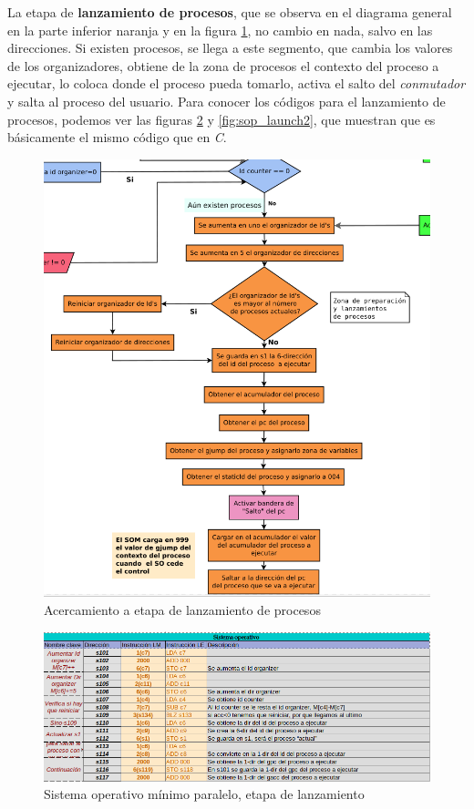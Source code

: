 \documentclass[letterpaper,12pt,oneside]{book}
\begin{document}
			
			La etapa de \textbf{lanzamiento de procesos}, que se observa en el diagrama general en la parte inferior naranja
			y en la figura \ref{fig:diag_somp_launch_process}, no cambio en nada, 
			salvo en las direcciones. Si existen procesos,
			se llega a este segmento, que cambia los valores de los organizadores, obtiene de la zona de procesos el contexto del proceso
			a ejecutar,
			lo coloca donde el proceso pueda tomarlo, activa el salto del \textit{conmutador} y salta al proceso del usuario. Para 
			conocer los códigos para el lanzamiento de procesos, podemos ver las figuras \ref{fig:sop_launch} y \ref{fig:sop_launch2},
			que muestran que es básicamente el mismo código que en \textit{C}.
			
		
			\begin{figure}[H]		
				\centering
				\includegraphics[scale=0.45]{media/Paralela/diag_somp_launch_process.png}
				\caption{Acercamiento a etapa de lanzamiento de procesos}
				\label{fig:diag_somp_launch_process}
			\end{figure}	
			
			
			\begin{figure}[H]		
				\centering
				\includegraphics[scale=0.53]{media/Paralela/sop_launch1.png}
				\caption{Sistema operativo mínimo paralelo, etapa de lanzamiento}
				\label{fig:sop_launch}
			\end{figure}	
			
\end{document}
